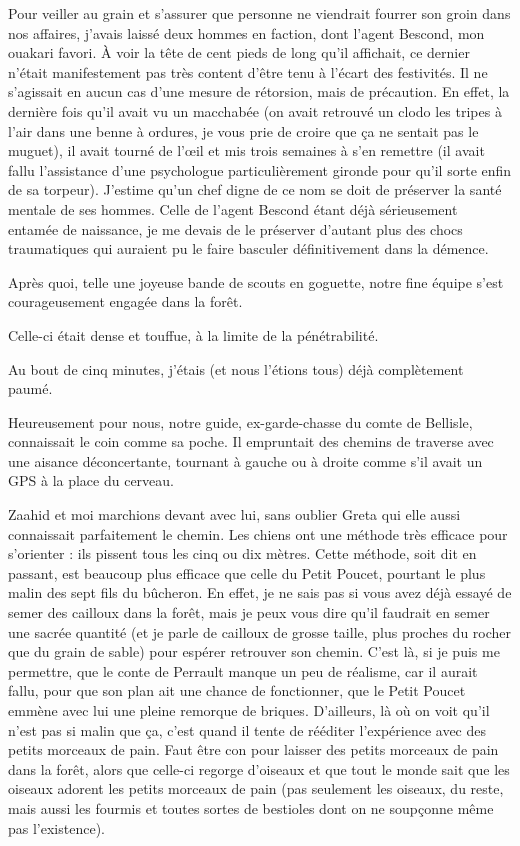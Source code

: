 Pour veiller au grain et s’assurer que personne ne viendrait fourrer son groin dans nos affaires, j’avais laissé deux hommes en faction, dont l’agent Bescond, mon ouakari favori. À voir la tête de cent pieds de long qu’il affichait, ce dernier n’était manifestement pas très content d’être tenu à l’écart des festivités. Il ne s’agissait en aucun cas d’une mesure de rétorsion, mais de précaution. En effet, la dernière fois qu’il avait vu un macchabée (on avait retrouvé un clodo les tripes à l’air dans une benne à ordures, je vous prie de croire que ça ne sentait pas le muguet), il avait tourné de l’œil et mis trois semaines à s’en remettre (il avait fallu l’assistance d’une psychologue particulièrement gironde pour qu’il sorte enfin de sa torpeur). J’estime qu’un chef digne de ce nom se doit de préserver la santé mentale de ses hommes. Celle de l’agent Bescond étant déjà sérieusement entamée de naissance, je me devais de le préserver d’autant plus des chocs traumatiques qui auraient pu le faire basculer définitivement dans la démence.

Après quoi, telle une joyeuse bande de scouts en goguette, notre fine équipe s’est courageusement engagée dans la forêt.

Celle-ci était dense et touffue, à la limite de la pénétrabilité.

Au bout de cinq minutes, j’étais (et nous l’étions tous) déjà complètement paumé.

Heureusement pour nous, notre guide, ex-garde-chasse du comte de Bellisle, connaissait le coin comme sa poche. Il empruntait des chemins de traverse avec une aisance déconcertante, tournant à gauche ou à droite comme s’il avait un GPS à la place du cerveau.

Zaahid et moi marchions devant avec lui, sans oublier Greta qui elle aussi connaissait parfaitement le chemin. \label{rat:17}Les chiens ont une méthode très efficace pour s’orienter : ils pissent tous les cinq ou dix mètres. Cette méthode, soit dit en passant, est beaucoup plus efficace que celle du Petit Poucet, pourtant le plus malin des sept fils du bûcheron. En effet, je ne sais pas si vous avez déjà essayé de semer des cailloux dans la forêt, mais je peux vous dire qu’il faudrait en semer une sacrée quantité (et je parle de cailloux de grosse taille, plus proches du rocher que du grain de sable) pour espérer retrouver son chemin. C’est là, si je puis me permettre, que le conte de Perrault manque un peu de réalisme, car il aurait fallu, pour que son plan ait une chance de fonctionner, que le Petit Poucet emmène avec lui une pleine remorque de briques. D’ailleurs, là où on voit qu’il n’est pas si malin que ça, c’est quand il tente de rééditer l’expérience avec des petits morceaux de pain. Faut être con pour laisser des petits morceaux de pain dans la forêt, alors que celle-ci regorge d’oiseaux et que tout le monde sait que les oiseaux adorent les petits morceaux de pain (pas seulement les oiseaux, du reste, mais aussi les fourmis et toutes sortes de bestioles dont on ne soupçonne même pas l’existence).

